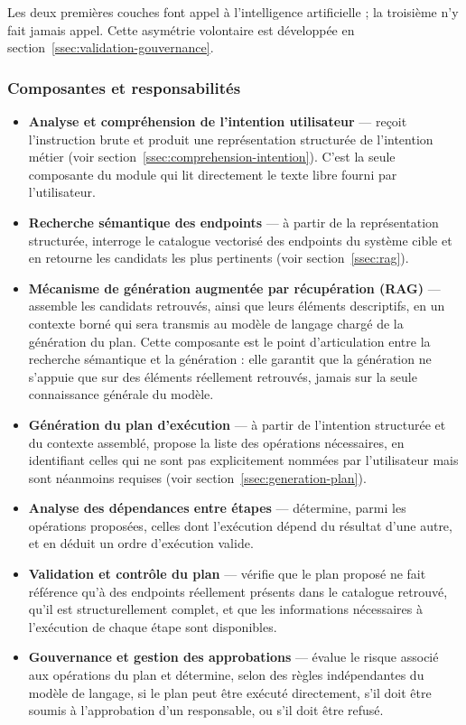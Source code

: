 Les deux premières couches font appel à l'intelligence artificielle ; la troisième n'y fait jamais appel. Cette asymétrie volontaire est développée en section~\ref{ssec:validation-gouvernance}.

\subsubsection{Composantes et responsabilités}

\begin{itemize}
    \item \textbf{Analyse et compréhension de l'intention utilisateur} — reçoit l'instruction brute et produit une représentation structurée de l'intention métier (voir section~\ref{ssec:comprehension-intention}). C'est la seule composante du module qui lit directement le texte libre fourni par l'utilisateur.
    \item \textbf{Recherche sémantique des endpoints} — à partir de la représentation structurée, interroge le catalogue vectorisé des endpoints du système cible et en retourne les candidats les plus pertinents (voir section~\ref{ssec:rag}).
    \item \textbf{Mécanisme de génération augmentée par récupération (RAG)} — assemble les candidats retrouvés, ainsi que leurs éléments descriptifs, en un contexte borné qui sera transmis au modèle de langage chargé de la génération du plan. Cette composante est le point d'articulation entre la recherche sémantique et la génération : elle garantit que la génération ne s'appuie que sur des éléments réellement retrouvés, jamais sur la seule connaissance générale du modèle.
    \item \textbf{Génération du plan d'exécution} — à partir de l'intention structurée et du contexte assemblé, propose la liste des opérations nécessaires, en identifiant celles qui ne sont pas explicitement nommées par l'utilisateur mais sont néanmoins requises (voir section~\ref{ssec:generation-plan}).
    \item \textbf{Analyse des dépendances entre étapes} — détermine, parmi les opérations proposées, celles dont l'exécution dépend du résultat d'une autre, et en déduit un ordre d'exécution valide.
    \item \textbf{Validation et contrôle du plan} — vérifie que le plan proposé ne fait référence qu'à des endpoints réellement présents dans le catalogue retrouvé, qu'il est structurellement complet, et que les informations nécessaires à l'exécution de chaque étape sont disponibles.
    \item \textbf{Gouvernance et gestion des approbations} — évalue le risque associé aux opérations du plan et détermine, selon des règles indépendantes du modèle de langage, si le plan peut être exécuté directement, s'il doit être soumis à l'approbation d'un responsable, ou s'il doit être refusé.
\end{itemize}

